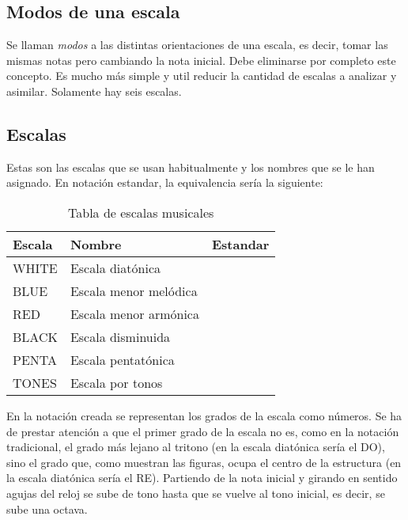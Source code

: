 \documentclass[]{article}
\begin{document}
\subsection{Modos de una escala}

Se llaman \emph{modos} a las distintas orientaciones de una escala, es decir, tomar las mismas notas pero cambiando la nota inicial. Debe eliminarse por completo este concepto. Es mucho más simple y util reducir la cantidad de escalas a analizar y asimilar. Solamente hay seis escalas.

\subsection{Escalas}

Estas son las escalas que se usan habitualmente y los nombres que se le han asignado. En notación estandar, la equivalencia sería la siguiente:

\begin{table}[htbp]
  \centering
  \begin{tabular}{lll}
    \toprule
    \textbf{\textsf{Escala}} & \textbf{Nombre} & \textbf{Estandar} \\
    \midrule
    \textsf{WHITE}   & Escala diatónica & \\
    \textsf{BLUE}    & Escala menor melódica & \\
    \textsf{RED} & Escala menor armónica & \\
    \textsf{BLACK}   & Escala disminuida & \\
    \textsf{PENTA}   & Escala pentatónica & \\
    \textsf{TONES}   & Escala por tonos & \\
    \bottomrule
  \end{tabular}
  \caption{Tabla de escalas musicales}
  \label{tab:scale-name-equivalences}
\end{table}

En la notación creada se representan los grados de la escala como números. Se ha de prestar atención a que el primer grado de la escala no es, como en la notación tradicional, el grado más lejano al tritono (en la escala diatónica sería el DO), sino el grado que, como muestran las figuras, ocupa el centro de la estructura (en la escala diatónica sería el RE). Partiendo de la nota inicial y girando en sentido agujas del reloj se sube de tono hasta que se vuelve al tono inicial, es decir, se sube una octava.
\end{document}
